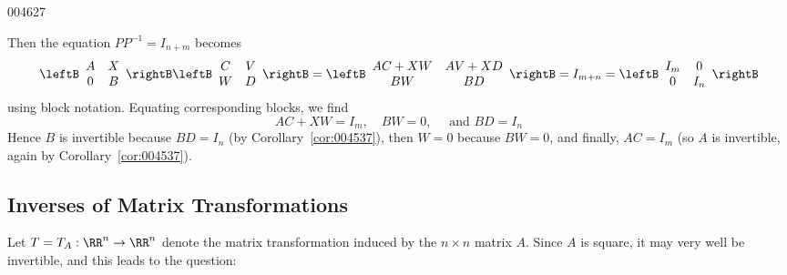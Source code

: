 \begin{example}{}{004627}
\begin{solution}
\begin{enumerate}[label={\alph*.}]
Then the equation $PP^{-1} = I_{n+m}$ becomes
\begin{equation*}
\leftB \begin{array}{cc}
A & X \\
0 & B
\end{array} \rightB \leftB \begin{array}{cc}
C & V \\
W & D
\end{array} \rightB = \leftB \begin{array}{cc}
AC + XW & AV + XD \\
BW & BD
\end{array} \rightB = I_{m + n} = \leftB \begin{array}{cc}
I_{m} & 0 \\
0 & I_{n}
\end{array} \rightB
\end{equation*}
using block notation. Equating corresponding blocks, we find
\begin{equation*}
AC + XW = I_{m}, \quad BW = 0, \quad \mbox{ and } BD = I_{n}
\end{equation*}
Hence $B$ is invertible because $BD = I_{n}$ (by Corollary~\ref{cor:004537}), then $W = 0$ because $BW = 0$, and finally, $AC = I_{m}$ (so $A$ is invertible, again by Corollary~\ref{cor:004537}).

\end{enumerate}
\end{solution}
\end{example}


\subsection*{Inverses of Matrix Transformations}


Let $T = T_{A} : \RR^{n} \to \RR^{n}$ denote the matrix transformation induced by the $n \times n$ matrix $A$. Since $A$ is square, it may very well be invertible, and this leads to the question:


